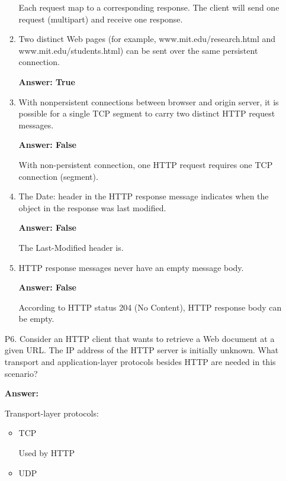 \begin{enumerate}
\begin{enumerate}
        Each request map to a corresponding response. The client will send one request (multipart) and receive one response.
        
        \item Two distinct Web pages (for example, www.mit.edu/research.html and www.mit.edu/students.html) can be sent over the same persistent connection.
        
        \textbf{Answer: True}
        
        \item With nonpersistent connections between browser and origin server, it is possible for a single TCP segment to carry two distinct HTTP request messages.
        
        \textbf{Answer: False}
        
        With non-persistent connection, one HTTP request requires one TCP connection (segment).
        
        \item The Date: header in the HTTP response message indicates when the object in the response was last modified.
        
        \textbf{Answer: False}
        
        The Last-Modified header is.
        
        \item HTTP response messages never have an empty message body.
        
        \textbf{Answer: False}
        
        According to HTTP status 204 (No Content), HTTP response body can be empty.
        
    \end{enumerate}
    
    \item[P6.] Consider an HTTP client that wants to retrieve a Web document at a given URL. The IP address of the HTTP server is initially unknown. What transport and application-layer protocols besides HTTP are needed in this scenario?
    
    \textbf{Answer:}
    
    Transport-layer protocols:
    
    \begin{itemize}
        \item TCP
        
        Used by HTTP
        
        \item UDP
        

\end{itemize}
\end{enumerate}
